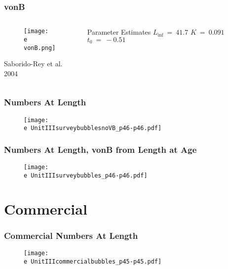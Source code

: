 \documentclass{beamer}
\begin{document}
\begin{frame}
\frametitle{vonB}

\begin{columns}
\begin{column}{0.75\textwidth}
\begin{figure}
\centering
    \texttt{[image: \\e vonB.png]}

%
\end{figure}
\vspace*{-2.2cm}
\centerline{\tiny{Saborido-Rey et al. 2004}}

\end{column}
%
\begin{column}{0.25\textwidth}
\begin{block}{Parameter Estimates}
\centering
		$ L_{\inf} \ = \ 41.7 $ 
		$K\ =\ 0.091 $
		$t_{0}\ =\ -0.51	$
\end{block}
\end{column}

\end{columns}
 \end{frame}

%

\begin{frame}
\frametitle{Numbers At Length}
\vspace{-1cm}
\begin{figure}
\centering
 \centerline{\texttt{[image: \\e UnitIIIsurveybubblesnoVB\_p46-p46.pdf]}}

 \end{figure}
 \end{frame}


\begin{frame}
\frametitle{Numbers At Length, vonB from Length at Age}
\vspace{-1cm}
\begin{figure}
\centering
 \centerline{\texttt{[image: \\e UnitIIIsurveybubbles\_p46-p46.pdf]}}

 \end{figure}
 \end{frame}
\section{Commercial}
\begin{frame}
\frametitle{Commercial Numbers At Length}
\vspace{-1cm}
\begin{figure}
\centering
 \centerline{\texttt{[image: \\e UnitIIIcommercialbubbles\_p45-p45.pdf]}}

 \end{figure}
 \end{frame}
\end{document}
